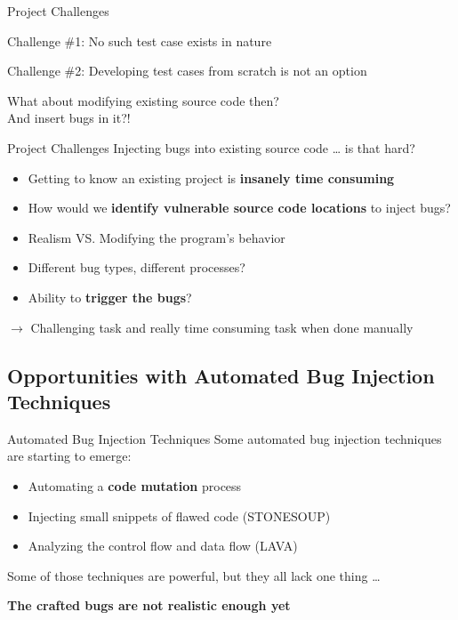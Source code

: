 \documentclass[aspectratio=169]{beamer}
\begin{document}
  \begin{frame}{Project Challenges}
    \begin{block}{Challenge \#1:}
      No such test case exists in nature
    \end{block}
    \pause
    \begin{block}{Challenge \#2:}
      Developing test cases from scratch is not an option
    \end{block}
    \pause
    \vspace{1.5em}
    \centering
    \begin{LARGE}
      What about modifying existing source code then?\\ And \alert{insert bugs} in it?!
    \end{LARGE}
  \end{frame}

  \begin{frame}{Project Challenges}
    Injecting bugs into existing source code \ldots{} is that hard?\\
    \pause
    \begin{itemize}
    \setlength\itemsep{0.4em}
    \item Getting to know an existing project is \textbf{insanely time consuming}
    \pause
    \item How would we \textbf{identify vulnerable source code locations} to inject bugs?
    \pause
    \item Realism VS. Modifying the program's behavior
    \pause
    \item Different bug types, different processes?
    \pause
    \item Ability to \textbf{trigger the bugs}?
    \end{itemize}
    \pause
    \vspace{0.5em}
    $\rightarrow$ Challenging task and really {\LARGE\alert{time consuming}} task when done manually
  \end{frame}
  
  \subsection{Opportunities with Automated Bug Injection Techniques}

  \begin{frame}{Automated Bug Injection Techniques}
    Some automated bug injection techniques are starting to emerge:
    \begin{itemize}
    \item Automating a \textbf{code mutation} process
    \item Injecting small snippets of flawed code (STONESOUP)
    \item Analyzing the control flow and data flow (LAVA)
    \end{itemize}
    \pause
    Some of those techniques are \alert{powerful}, but they all lack one thing \ldots{}
    \pause
    \begin{center}
      \begin{large}
        \textbf{The crafted bugs are not realistic enough yet}
      \end{large}
    \end{center}
  \end{frame} 
\end{document}
